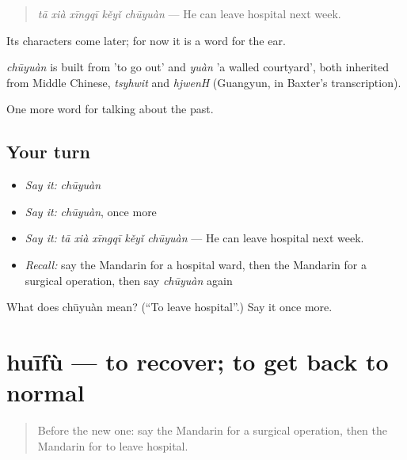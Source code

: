 \begin{quote}
\emph{tā xià xīngqī kěyǐ chūyuàn} — He can leave hospital next week.
\end{quote}

Its characters come later; for now it is a word for the ear.

\begin{cousinweb}
\emph{chūyuàn} is built from  'to go out' and \emph{yuàn} 'a walled courtyard', both inherited from Middle Chinese, \emph{tsyhwit} and \emph{hjwenH} (Guangyun, in Baxter's transcription).
\end{cousinweb}

\begin{grammarlens}[title={What you've built}]
One more word for talking about the past.
\end{grammarlens}

\subsection*{Your turn}
\begin{itemize}
\raggedright
  \item \emph{Say it:} \emph{chūyuàn}
  \item \emph{Say it:} \emph{chūyuàn}, once more
  \item \emph{Say it:} \emph{tā xià xīngqī kěyǐ chūyuàn} — He can leave hospital next week.
  \item \emph{Recall:} say the Mandarin for a hospital ward, then the Mandarin for a surgical operation, then say \emph{chūyuàn} again
\end{itemize}

\begin{tcolorbox}[breakable,colback=teal!4,colframe=teal!35!black,title={Before you move on}]
What does chūyuàn mean? (\textquotedblleft{}To leave hospital\textquotedblright{}.) Say it once more.
\end{tcolorbox}
\section[huīfù]{huīfù — to recover; to get back to normal}

\label{lesson:ZH-C241-huifu-recover}



\begin{quote}
Before the new one: say the Mandarin for a surgical operation, then the Mandarin for to leave hospital.
\end{quote}

